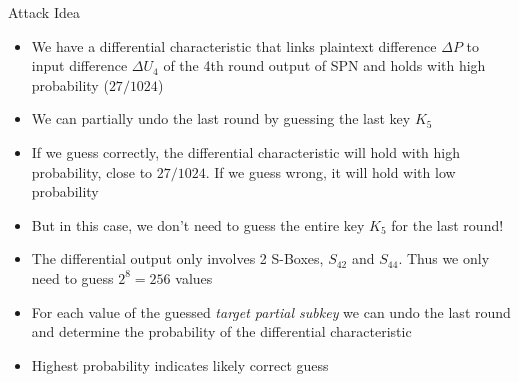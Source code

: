 \documentclass[9pt]{beamer}
\begin{document}
\begin{frame}
Attack Idea
\begin{itemize}[<+->]
\item{We have a differential characteristic that links plaintext difference $\Delta P$ to input difference $\Delta U_4$ of the 4th round output of SPN and holds with high probability ($27/1024$)}
\item{We can partially undo the last round by guessing the last key $K_5$}
\item{If we guess correctly, the differential characteristic will hold with high probability, close to $27/1024$. If we guess wrong, it will hold with low probability}
\item{But in this case, we don't need to guess the entire key $K_5$ for the last round!}
\item{The differential output only involves 2 S-Boxes, $S_{42}$ and $S_{44}$. Thus we only need to guess $2^8 = 256$ values}
\item{For each value of the guessed \textit{target partial subkey} we can undo the last round and determine the probability of the differential characteristic}
\item{Highest probability indicates likely correct guess}
\end{itemize}

\end{frame}
\end{document}
